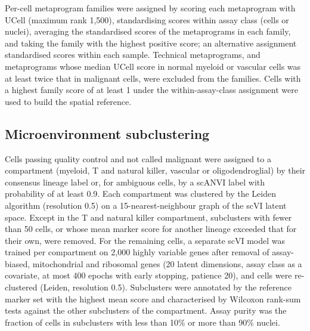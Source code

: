 \documentclass[11pt,a4paper]{article}
\begin{document}
Per-cell metaprogram families were assigned by scoring each metaprogram with UCell \citep{andreatta2021ucell} (maximum rank 1,500), standardising
scores within assay class (cells or nuclei), averaging the standardised scores of the metaprograms in each family, and
taking the family with the highest positive score; an alternative assignment standardised scores within each sample.
Technical metaprograms, and metaprograms whose median UCell score in normal myeloid or vascular cells was at least twice that
in malignant cells, were excluded from the families. Cells with a highest family score of at least 1 under the
within-assay-class assignment were used to build the spatial reference.

\subsection{Microenvironment subclustering}
Cells passing quality control and not called malignant were assigned to a compartment (myeloid, T and natural killer,
vascular or oligodendroglial) by their consensus lineage label or, for ambiguous cells, by a scANVI label with probability
of at least 0.9. Each compartment was clustered by the Leiden algorithm (resolution 0.5) on a 15-nearest-neighbour graph
of the scVI latent space. Except in the T and natural killer compartment, subclusters with fewer than 50 cells, or whose
mean marker score for another lineage exceeded that for their own, were removed. For the remaining cells, a
separate scVI model was trained per compartment on 2,000 highly variable genes after removal of assay-biased,
mitochondrial and ribosomal genes (20 latent dimensions, assay class as a covariate, at most 400 epochs with early stopping,
patience 20), and cells were re-clustered (Leiden, resolution 0.5). Subclusters were annotated by the reference marker set
with the highest mean score and characterised by Wilcoxon rank-sum tests against the other subclusters of the compartment.
Assay purity was the fraction of cells in subclusters with less than 10\% or more than 90\% nuclei.
\end{document}
